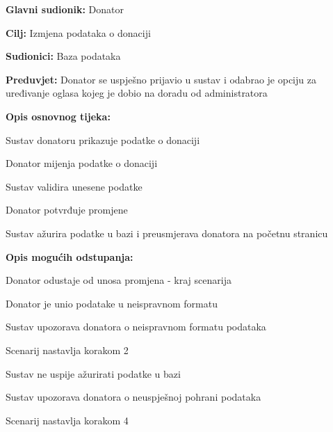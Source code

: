 					\noindent {}
					\begin{packed_item}
	
						\item \textbf{Glavni sudionik: }Donator
						\item  \textbf{Cilj:} Izmjena podataka o donaciji
						\item  \textbf{Sudionici:} Baza podataka
						\item  \textbf{Preduvjet:} Donator se uspješno prijavio u sustav i odabrao je opciju za uređivanje oglasa kojeg je dobio na doradu od administratora
						\eject
						\item  \textbf{Opis osnovnog tijeka:}
						
						\item[] \begin{packed_enum}
							\item Sustav donatoru prikazuje podatke o donaciji
							\item Donator mijenja podatke o donaciji
							\item Sustav validira unesene podatke
							\item Donator potvrđuje promjene
							\item Sustav ažurira podatke u bazi i preusmjerava donatora na početnu stranicu
						\end{packed_enum}

						\item  \textbf{Opis mogućih odstupanja:}

						\item[] \begin{packed_item}
							\item[2.a] Donator odustaje od unosa promjena - kraj scenarija
							\item[3.a] Donator je unio podatake u neispravnom formatu
							\item[] \begin{packed_enum}
								\item Sustav upozorava donatora o neispravnom formatu podataka
								\item Scenarij nastavlja korakom 2 
							\end{packed_enum}	
							\item[5.a] Sustav ne uspije ažurirati podatke u bazi
							\item[] \begin{packed_enum}
								\item Sustav upozorava donatora o neuspješnoj pohrani podataka
								\item Scenarij nastavlja korakom 4
							\end{packed_enum}					
						\end{packed_item}
					\end{packed_item}

